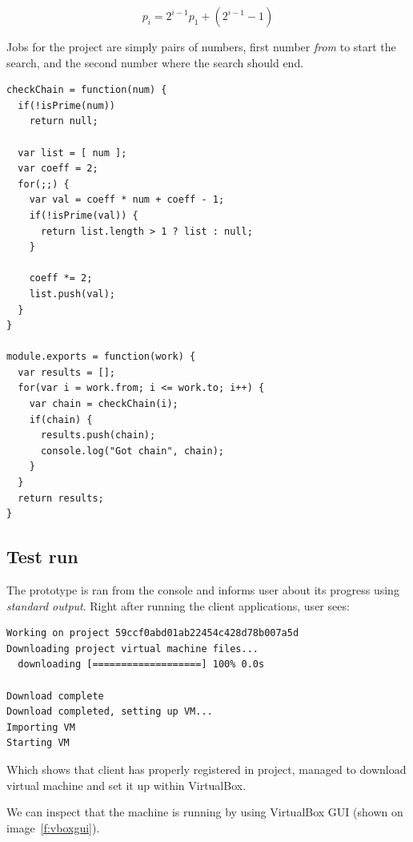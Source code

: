 \begin{equation}
p_i = 2^{i-1}p_1 + (2^{i-1}-1)
\end{equation}

Jobs for the project are simply pairs of numbers, first number \emph{from} to start the search, and the second number where the search should end.

\begin{lstlisting}[caption=Javascript code for searching Cunningham chains.]
checkChain = function(num) {
  if(!isPrime(num))
    return null;

  var list = [ num ];
  var coeff = 2;
  for(;;) {
    var val = coeff * num + coeff - 1;
    if(!isPrime(val)) {
      return list.length > 1 ? list : null;
    }

    coeff *= 2;
    list.push(val);
  }
}

module.exports = function(work) {
  var results = [];
  for(var i = work.from; i <= work.to; i++) {
    var chain = checkChain(i);
    if(chain) {
      results.push(chain);
      console.log("Got chain", chain);
    }
  }
  return results;
}
\end{lstlisting}

\subsection{Test run}

The prototype is ran from the console and informs user about its progress using \emph{standard output}. Right after running the client applications, user sees:

\begin{lstlisting}[caption=Standard output of client application.]
Working on project 59ccf0abd01ab22454c428d78b007a5d
Downloading project virtual machine files...
  downloading [===================] 100% 0.0s

Download complete
Download completed, setting up VM...
Importing VM
Starting VM
\end{lstlisting}

Which shows that client has properly registered in project, managed to download virtual machine and set it up within VirtualBox.

We can inspect that the machine is running by using VirtualBox GUI (shown on image~\ref{f:vboxgui}).

